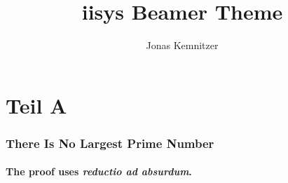 \documentclass[12pt]{beamer}
\title{iisys Beamer Theme}
\author{Jonas Kemnitzer}
\institute{FG Intelligente \& Lernende Systeme}
\begin{document}
    \begin{frame}
        \titlepage
    \end{frame}


    \section{Teil A}
    \begin{frame}
        \frametitle{There Is No Largest Prime Number}
        \framesubtitle{The proof uses \textit{reductio ad absurdum}.}
    \end{frame}
\end{document}
